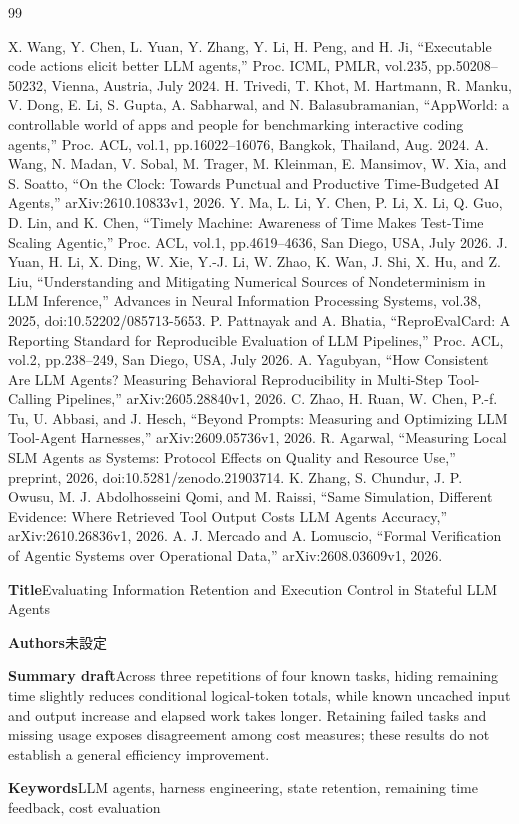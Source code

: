 \documentclass[uplatex,a4paper,twocolumn,10pt]{jsarticle}
\begin{document}
\begin{thebibliography}{99}
\raggedright
{} X. Wang, Y. Chen, L. Yuan, Y. Zhang, Y. Li, H. Peng, and H. Ji, ``Executable code actions elicit better LLM agents,'' Proc. ICML, PMLR, vol.235, pp.50208--50232, Vienna, Austria, July 2024.
 H. Trivedi, T. Khot, M. Hartmann, R. Manku, V. Dong, E. Li, S. Gupta, A. Sabharwal, and N. Balasubramanian, ``AppWorld: a controllable world of apps and people for benchmarking interactive coding agents,'' Proc. ACL, vol.1, pp.16022--16076, Bangkok, Thailand, Aug. 2024.
 A. Wang, N. Madan, V. Sobal, M. Trager, M. Kleinman, E. Mansimov, W. Xia, and S. Soatto, ``On the Clock: Towards Punctual and Productive Time-Budgeted AI Agents,'' arXiv:2610.10833v1, 2026.
 Y. Ma, L. Li, Y. Chen, P. Li, X. Li, Q. Guo, D. Lin, and K. Chen, ``Timely Machine: Awareness of Time Makes Test-Time Scaling Agentic,'' Proc. ACL, vol.1, pp.4619--4636, San Diego, USA, July 2026.
 J. Yuan, H. Li, X. Ding, W. Xie, Y.-J. Li, W. Zhao, K. Wan, J. Shi, X. Hu, and Z. Liu, ``Understanding and Mitigating Numerical Sources of Nondeterminism in LLM Inference,'' Advances in Neural Information Processing Systems, vol.38, 2025, doi:10.52202/085713-5653.
 P. Pattnayak and A. Bhatia, ``ReproEvalCard: A Reporting Standard for Reproducible Evaluation of LLM Pipelines,'' Proc. ACL, vol.2, pp.238--249, San Diego, USA, July 2026.
 A. Yagubyan, ``How Consistent Are LLM Agents? Measuring Behavioral Reproducibility in Multi-Step Tool-Calling Pipelines,'' arXiv:2605.28840v1, 2026.
 C. Zhao, H. Ruan, W. Chen, P.-f. Tu, U. Abbasi, and J. Hesch, ``Beyond Prompts: Measuring and Optimizing LLM Tool-Agent Harnesses,'' arXiv:2609.05736v1, 2026.
 R. Agarwal, ``Measuring Local SLM Agents as Systems: Protocol Effects on Quality and Resource Use,'' preprint, 2026, doi:10.5281/zenodo.21903714.
 K. Zhang, S. Chundur, J. P. Owusu, M. J. Abdolhosseini Qomi, and M. Raissi, ``Same Simulation, Different Evidence: Where Retrieved Tool Output Costs LLM Agents Accuracy,'' arXiv:2610.26836v1, 2026.
 A. J. Mercado and A. Lomuscio, ``Formal Verification of Agentic Systems over Operational Data,'' arXiv:2608.03609v1, 2026.
\end{thebibliography}
\clearpage
\onecolumn
\noindent\textbf{Title}\quad Evaluating Information Retention and Execution Control in Stateful LLM Agents

\noindent\textbf{Authors}\quad 未設定

\noindent\textbf{Summary draft}\quad Across three repetitions of four known tasks, hiding remaining time slightly reduces conditional logical-token totals, while known uncached input and output increase and elapsed work takes longer. Retaining failed tasks and missing usage exposes disagreement among cost measures; these results do not establish a general efficiency improvement.

\noindent\textbf{Keywords}\quad LLM agents, harness engineering, state retention, remaining time feedback, cost evaluation
\end{document}

